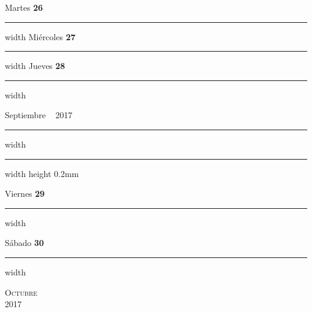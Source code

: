 \documentclass[portrait]{article}
\newcommand\blankpage{%
\null 
\thispagestyle{empty}%
\addtocounter{page}{-1}%
\newpage}
\begin{document}
\hfill \break \hfill \break 
{\Large Martes} {\LARGE\color{Dandelion} \textbf{26}}  \hfill \break\hrule width \hsize \kern 2pt\hfill \break \hfill \break \hfill \break \hfill \break \hfill \break \break 
\hfill \break \hfill \break 
{\Large Mi\'ercoles} {\LARGE\color{Dandelion} \textbf{27}}  \hfill \break\hrule width \hsize \kern 2pt\hfill \break \hfill \break \hfill \break \hfill \break \hfill \break \break 
\hfill \break \hfill \break 
{\Large Jueves} {\LARGE\color{Dandelion} \textbf{28}}  \hfill \break\hrule width \hsize \kern 2pt\hfill \break \hfill \break \hfill \break \hfill \break \hfill \break \break 
\newpage {} \begin{flushright}{\Huge Septiembre} ~ {\color{Dandelion} \large 2017} \end{flushright} 
\hrule depth 0.3mm width \hsize \kern 1pt \hrule width \hsize height 0.2mm 
\hfill \break 
 \begin{flushright}{\Large Viernes} {\LARGE\color{Dandelion} \textbf{29}}\end{flushright}\hrule width \hsize \kern 2pt\hfill \break \hfill \break \hfill \break \hfill \break \hfill \break \break
\hfill \break 
 \begin{flushright}{\Large S\'abado} {\LARGE\color{Dandelion} \textbf{30}}\end{flushright}\hrule width \hsize \kern 2pt\hfill \break \hfill \break \hfill \break \hfill \break \hfill \break \break
\afterpage{\blankpage}\newpage {}\pagestyle{empty} %
\noindent 
{} %
\begin{center} 
\textsc{\Huge \color{Dandelion}Octubre}\\ %
\textsc{\large 2017} %
\end{center} 
\end{document}

